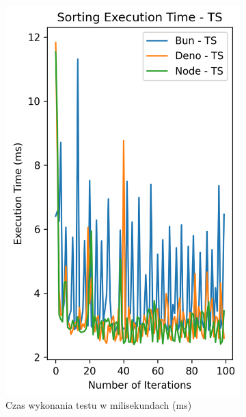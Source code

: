 \begin{figure}[H]
  \centering
  \begin{subfigure}[b]{0.42\textwidth}
    \centering
    \includegraphics[width=\textwidth]{Figures/sorting/sorting_quick_100_10000_ts_time.png}
    \caption{Czas wykonania testu w milisekundach (ms)}
    \label{fig:quick_sorting_e3_ts_time}
  \end{subfigure}
  \begin{subfigure}[b]{0.42\textwidth}
    \centering

\end{subfigure}
\end{figure}
